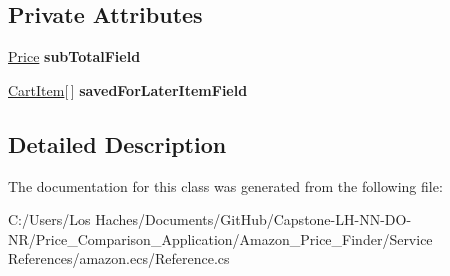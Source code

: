 \subsection*{Private Attributes}
\begin{DoxyCompactItemize}
\item 
\hypertarget{class_price___comparison_1_1amazon_1_1ecs_1_1_saved_for_later_items_aec6d0b251d163f502983d59f3f788f31}{\hyperlink{class_price___comparison_1_1amazon_1_1ecs_1_1_price}{Price} {\bfseries sub\-Total\-Field}}\label{class_price___comparison_1_1amazon_1_1ecs_1_1_saved_for_later_items_aec6d0b251d163f502983d59f3f788f31}

\item 
\hypertarget{class_price___comparison_1_1amazon_1_1ecs_1_1_saved_for_later_items_a85c6472f4f28a8bf0aa3483bb362686b}{\hyperlink{class_price___comparison_1_1amazon_1_1ecs_1_1_cart_item}{Cart\-Item}\mbox{[}$\,$\mbox{]} {\bfseries saved\-For\-Later\-Item\-Field}}\label{class_price___comparison_1_1amazon_1_1ecs_1_1_saved_for_later_items_a85c6472f4f28a8bf0aa3483bb362686b}

\end{DoxyCompactItemize}


\subsection{Detailed Description}


The documentation for this class was generated from the following file\-:\begin{DoxyCompactItemize}
\item 
C\-:/\-Users/\-Los Haches/\-Documents/\-Git\-Hub/\-Capstone-\/\-L\-H-\/\-N\-N-\/\-D\-O-\/\-N\-R/\-Price\-\_\-\-Comparison\-\_\-\-Application/\-Amazon\-\_\-\-Price\-\_\-\-Finder/\-Service References/amazon.\-ecs/Reference.\-cs\end{DoxyCompactItemize}
